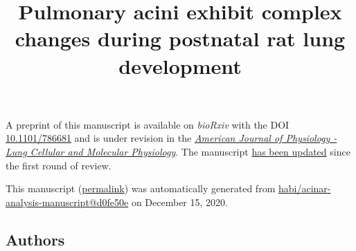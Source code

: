 \documentclass[
  american,
]{article}
\title{Pulmonary acini exhibit complex changes during postnatal rat lung development}
\author{}
\date{}
\begin{document}
\maketitle

A preprint of this manuscript is available on \emph{bioRxiv} with the DOI \href{https://doi.org/10.1101/786681}{10.1101/786681} and is under revision in the \href{https://journals.physiology.org/journal/ajplung}{\emph{American Journal of Physiology - Lung Cellular and Molecular Physiology}}.
The manuscript \href{https://github.com/habi/acinar-analysis-manuscript/compare/d6fc17bd66bdca5cbff30d53e1dbc02d5351609b...d0fe50ee2f2a7caa83758cf8364e3629637ef31a}{has been updated} since the first round of review.

This manuscript
(\href{https://habi.github.io/acinar-analysis-manuscript/v/d0fe50ee2f2a7caa83758cf8364e3629637ef31a/}{permalink})
was automatically generated
from \href{https://github.com/habi/acinar-analysis-manuscript/tree/d0fe50ee2f2a7caa83758cf8364e3629637ef31a}{habi/acinar-analysis-manuscript@d0fe50e}
on December 15, 2020.

\hypertarget{authors}{%
\subsection{Authors}\label{authors}}
\end{document}
